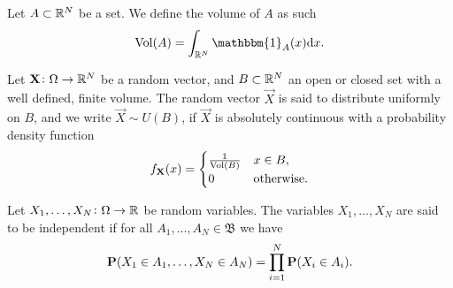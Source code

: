 \documentclass[11pt,a4paper]{article}
\begin{document}
\begin{definition}[Volume]
  Let $A \subset \mathbb{R}^N$ be a set. We define the volume of $A$ as such
  \[
    \Vol(A) = \int_{\R^N} \mathbbm{1}_A(x) \dx.
  \]
\end{definition}

\begin{definition}
  Let $\boldsymbol{\mathbf{X}} \colon \Omega \to \mathbb{R}^N$ be a random vector, 
  and $B \subset \mathbb{R}^N$ an open or closed set with a well defined, finite volume.
  The random vector $\vec{X}$ is said to distribute uniformly on $B$, and
  we write $\vec{X} \sim U(B)$,
  if $\vec{X}$ is absolutely continuous with a 
  probability density function
  \[
    f_{\boldsymbol{\mathbf{X}}}(x) =
    \begin{cases}
      \frac{1}{\operatorname{Vol}(B)} &x \in B, \\
      0 &\text{otherwise}.
    \end{cases}
  \]
\end{definition}

%

\begin{definition}[Independence]
  Let $X_1,\dots,X_N \colon \Omega \to \mathbb{R}$ be random variables.
  The variables $X_1,\dots,X_N$ are said to be independent if
  for all $A_1,\dots,A_N \in \mathfrak B$ we have
  \[
    \mathbf{P}(X_1 \in A_1, \dots, X_N \in A_N) =
    \prod_{i=1}^{N} \mathbf{P}(X_i \in A_i).
  \]
\end{definition}
\end{document}
